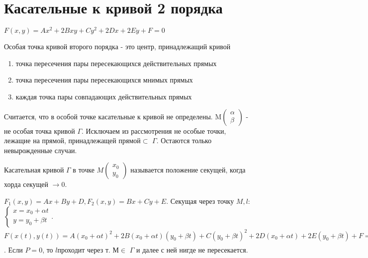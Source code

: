 \section{Касательные к кривой 2 порядка}
\(F(x,y) = Ax^2+2Bxy+ Cy^2+2Dx+2Ey+F = 0 \)
\begin{definition}
	Особая точка кривой второго порядка - это центр, принадлежащий кривой 
	\begin{enumerate}
		\item точка пересечения пары пересекающихся действительных прямых
		\item точка пересечения пары пересекающихся мнимых прямых
		\item каждая точка пары совпадающих действительных прямых 
	\end{enumerate}
\end{definition}
Считается, что в особой точке касательные к кривой не определены. M\(\begin{pmatrix}
	\alpha \\ \beta
\end{pmatrix}\) - не особая точка кривой $\Gamma$. Исключаем из рассмотрения не особые точки, лежащие на прямой, принадлежащей прямой\(\subset\) $\Gamma$. Остаются только невырожденные случаи.
\begin{definition}
	Касательная кривой $\Gamma$ в точке \(M\begin{pmatrix}
		x_0 \\ y_0
	\end{pmatrix}\) называется положение секущей, когда хорда секущей $\to 0$.
\end{definition}
\(F_1(x,y) = Ax+By+D, F_2(x,y) = Bx+Cy+E\). Секущая через точку $M, l$:\(\left\{\begin{gathered}
	x = x_0 +\alpha t \\ y = y_0 + \beta t
\end{gathered}\right.\). \newline
\(F(x(t), y(t)) = A(x_0+\alpha t)^2+2B(x_0+\alpha t)(y_0+\beta t) + C(y_0+\beta t)^2 + 2D(x_0+\alpha t)+2E(y_0+\beta t)+F = 0\Longleftrightarrow Pt^2+2Qt+R = 0, P = \alpha^2A+2B\alpha\beta+C\beta^2 = (\alpha\quad \beta)\begin{pmatrix}
	A & B \\ B & C
\end{pmatrix}\begin{pmatrix}
\alpha \\ \beta
\end{pmatrix}, Q = (Ax_0+By_0+D)\alpha + (Bx_0 + Cy_0 + E)\beta, R = F(x_0, y_0) = 0 \Longrightarrow t(Pt+2Q) = 0\). Если $P=0$, то $l $проходит через т. $М\in$ $\Gamma$ и далее с ней нигде не пересекается.
